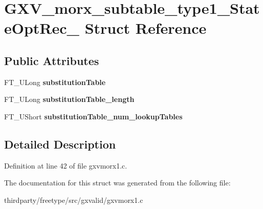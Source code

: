 \hypertarget{struct_g_x_v__morx__subtable__type1___state_opt_rec__}{}\section{G\+X\+V\+\_\+morx\+\_\+subtable\+\_\+type1\+\_\+\+State\+Opt\+Rec\+\_\+ Struct Reference}
\label{struct_g_x_v__morx__subtable__type1___state_opt_rec__}
\subsection*{Public Attributes}
\begin{DoxyCompactItemize}
\item 
\mbox{\label{struct_g_x_v__morx__subtable__type1___state_opt_rec___a0f5186b4022ef2f9f316f2256afc0648}} 
F\+T\+\_\+\+U\+Long {\bfseries substitution\+Table}
\item 
\mbox{\label{struct_g_x_v__morx__subtable__type1___state_opt_rec___ae99b4356adf4b91ccc163dfd5db9a89a}} 
F\+T\+\_\+\+U\+Long {\bfseries substitution\+Table\+\_\+length}
\item 
\mbox{\label{struct_g_x_v__morx__subtable__type1___state_opt_rec___a7e306d053dd6de8879a8f98896016bfe}} 
F\+T\+\_\+\+U\+Short {\bfseries substitution\+Table\+\_\+num\+\_\+lookup\+Tables}
\end{DoxyCompactItemize}


\subsection{Detailed Description}


Definition at line 42 of file gxvmorx1.\+c.



The documentation for this struct was generated from the following file\+:\begin{DoxyCompactItemize}
\item 
thirdparty/freetype/src/gxvalid/gxvmorx1.\+c\end{DoxyCompactItemize}
